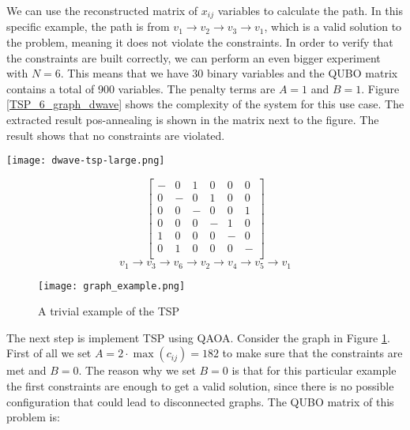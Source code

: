 \documentclass[12pt,a4paper]{report}
\begin{document}
\noindent
We can use the reconstructed matrix of \(x_{ij}\) variables to calculate the path. In this specific example, the path is from \(v_1 \to v_2 \to v_3 \to v_1\), which is a valid solution to the problem, meaning it does not violate the constraints. In order to verify that the constraints are built correctly, we can perform an even bigger experiment with \(N=6\). This means that we have 30 binary variables and the QUBO matrix contains a total of 900 variables. The penalty terms are \(A=1\) and \(B=1\). Figure \ref{TSP_6_graph_dwave} shows the complexity of the system for this use case. The extracted result pos-annealing is shown in the matrix next to the figure. The result shows that no constraints are violated.

\noindent
\begin{minipage}{0.5\textwidth}
\centering
\texttt{[image: dwave-tsp-large.png]}
\label{TSP_6_graph_dwave}
\end{minipage}%
\begin{minipage}{0.5\textwidth}
\centering
\[
\begin{bmatrix}
- & 0 & 1 & 0 & 0 & 0 \\
0 & - & 0 & 1 & 0 & 0 \\
0 & 0 & - & 0 & 0 & 1 \\
0 & 0 & 0 & - & 1 & 0 \\
1 & 0 & 0 & 0 & - & 0 \\
0 & 1 & 0 & 0 & 0 & - \\
\end{bmatrix}
\]
\[ 
v_1 \to v_3 \to v_6 \to v_2 \to v_4 \to v_5 \to v_1 
\]
\end{minipage}
\newpage

\begin{figure}[!h]
    \centering
    \texttt{[image: graph\_example.png]}
    \caption{A trivial example of the TSP}
    \label{fig:tsp_small_example}
\end{figure}

\noindent
The next step is implement TSP using QAOA. Consider the graph in Figure \ref{fig:tsp_small_example}. First of all we set \( A = 2 \cdot \max(c_{ij}) = 182 \) to make sure that the constraints are met and \(B=0\). The reason why we set \(B=0\) is that for this particular example the first constraints are enough to get a valid solution, since there is no possible configuration that could lead to disconnected graphs. The QUBO matrix of this problem is:
\end{document}
